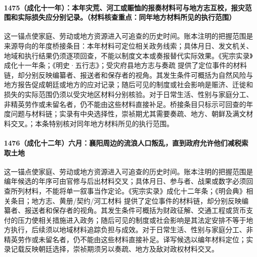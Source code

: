 \paragraph{1475（成化十一年）：本年灾荒、河工或赈恤的报奏材料可与地方志互校，报灾范围和实际损失应分别记录。（材料核查重点：同年地方材料所见的执行范围）} 这一锚点使家庭、劳动或地方资源进入可追查的历史时间。账本注明的把握范围是来源导向的年度桥接条目：本年材料可定位相关政务线索；具体月日、发文机关、地域和执行结果仍须逐项回查，不能以制度文本或奏报替代实际效果。《宪宗实录》成化十一年条；《明史·五行志》；受灾府县地方志与奏疏 提供了定位事件的材料链，却分别反映编纂者、报送者和保存者的视角。其发生条件可概括为自然风险与地方报告促成朝廷或地方的应对记录；随后可见的制度或社会影响是赈济、迁徙和损失的实际范围仍须以受灾地区材料分别核验。对于日常生活、性别与家庭分工、非精英劳作或未留名者，仍不能由这些材料直接补足。桥接条目只标示可回查的年度问题与材料链；实录有中央选择性，崇祯期尤其需要奏疏、地方、朝鲜及满文材料交叉。；本条特别核对同年地方材料所见的执行范围。

\paragraph{1476（成化十二年）六月：襄阳周边的流浪人口叛乱，直到政府允许他们减税索取土地} 这一锚点使家庭、劳动或地方资源进入可追查的历史时间。账本注明的把握范围是编年候选的年序可由官修与后出材料交叉；具体月日、参与者、战果或数字必须回查所列材料，不能将单一叙事当作定论。《宪宗实录》成化十二年条；《明会典》相关条目；地方志、黄册/契约/河工材料 提供了定位事件的材料链，却分别反映编纂者、报送者和保存者的视角。其发生条件可概括为财政征解、交通工程或货币支付的压力使相关措施进入政务；随后可见的制度或社会影响是其法定安排不等于地方执行，后续须以地域材料追踪负担与成效。对于日常生活、性别与家庭分工、非精英劳作或未留名者，仍不能由这些材料直接补足。译写候选以编年材料定位；实录记载反映朝廷选择，崇祯期须另以奏疏、地方及敌对政权材料交叉。
